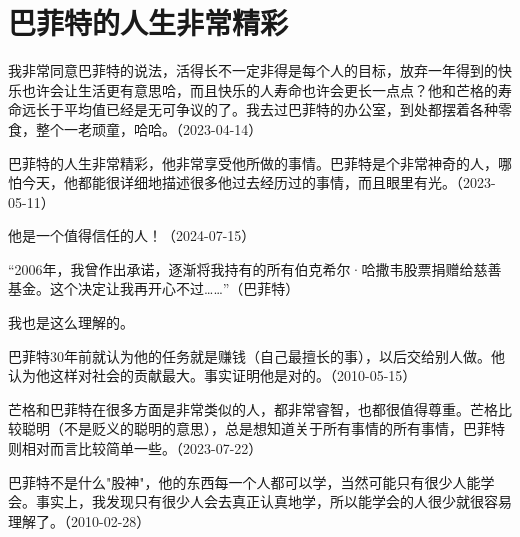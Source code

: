 
\section{巴菲特的人生非常精彩}


我非常同意巴菲特的说法，活得长不一定非得是每个人的目标，放弃一年得到的快乐也许会让生活更有意思哈，而且快乐的人寿命也许会更长一点点？他和芒格的寿命远长于平均值已经是无可争议的了。我去过巴菲特的办公室，到处都摆着各种零食，整个一老顽童，哈哈。（2023-04-14）

巴菲特的人生非常精彩，他非常享受他所做的事情。巴菲特是个非常神奇的人，哪怕今天，他都能很详细地描述很多他过去经历过的事情，而且眼里有光。（2023-05-11）


他是一个值得信任的人！（2024-07-15）

“2006年，我曾作出承诺，逐渐将我持有的所有伯克希尔·哈撒韦股票捐赠给慈善基金。这个决定让我再开心不过……”（巴菲特）


我也是这么理解的。

巴菲特30年前就认为他的任务就是赚钱（自己最擅长的事），以后交给别人做。他认为他这样对社会的贡献最大。事实证明他是对的。（2010-05-15）

芒格和巴菲特在很多方面是非常类似的人，都非常睿智，也都很值得尊重。芒格比较聪明（不是贬义的聪明的意思），总是想知道关于所有事情的所有事情，巴菲特则相对而言比较简单一些。（2023-07-22）

巴菲特不是什么"股神"，他的东西每一个人都可以学，当然可能只有很少人能学会。事实上，我发现只有很少人会去真正认真地学，所以能学会的人很少就很容易理解了。（2010-02-28）
